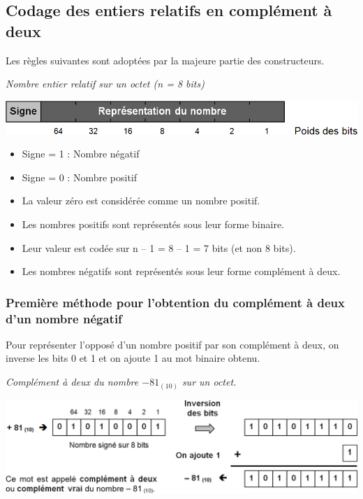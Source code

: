 \documentclass[10pt,fleqn]{article} %
\begin{document}
\subsection{Codage des entiers relatifs en complément à deux}
Les règles suivantes sont adoptées par la majeure partie des constructeurs.



\textit{Nombre entier relatif sur un octet (n = 8 bits)}

\begin{center}
\includegraphics[width=.7\textwidth]{images/entier_relatif_3}
\end{center}
\begin{itemize}
\item Signe = 1 : Nombre négatif 
\item Signe = 0 : Nombre positif
\item La valeur zéro est considérée comme un nombre positif.
\item Les nombres positifs sont représentés sous leur forme binaire.
\item Leur valeur est codée sur n – 1 = 8 – 1 = 7 bits (et non 8 bits).
\item Les nombres négatifs sont représentés sous leur forme complément à deux.
\end{itemize}

\subsubsection{Première méthode pour l’obtention du complément à deux d’un nombre négatif}

\begin{methode}
Pour représenter l’opposé d’un nombre positif par son complément à deux, on inverse les bits 0 et 1 et on ajoute 1 au mot binaire obtenu.
\end{methode}

\begin{exemple}
\textit{Complément à deux du nombre $-81_{(10)}$ sur un octet.}

\begin{center}
\includegraphics[width=.7\textwidth]{images/complement_2}
\end{center}

\end{exemple}
\end{document}

